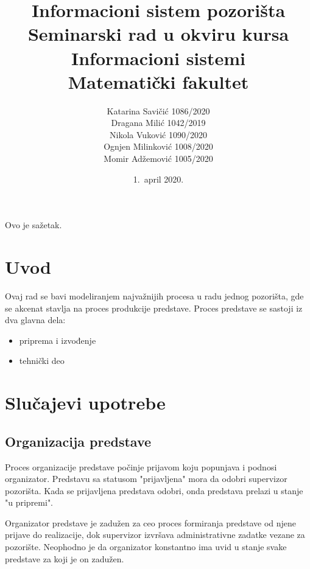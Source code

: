 \documentclass[a4paper]{article}
\begin{document}
\title{Informacioni sistem pozorišta\\ \small{Seminarski rad u okviru kursa\\Informacioni sistemi\\ Matematički fakultet}}

\author{
Katarina Savičić 1086/2020\\
Dragana Milić 1042/2019\\
Nikola Vuković 1090/2020\\
Ognjen Milinković 1008/2020\\
Momir Adžemović 1005/2020
}

\date{1.~april 2020.}

\maketitle

\abstract

Ovo je sažetak.

\newpage

\tableofcontents

\newpage

\section{Uvod}
Ovaj rad se bavi modeliranjem najvažnijih procesa u radu jednog pozorišta, gde se akcenat
stavlja na proces produkcije predstave. Proces predstave se sastoji iz dva glavna 
dela:\cite{hamilton_theatre_producing_the_drama}
\begin{itemize}
  \item priprema i izvođenje
  \item tehnički deo
\end{itemize}

\section{Slučajevi upotrebe}

\subsection{Organizacija predstave}
Proces organizacije predstave počinje prijavom koju popunjava i podnosi organizator. Predstavu sa statusom "prijavljena" mora da odobri supervizor pozorišta. Kada se prijavljena predstava odobri, onda predstava prelazi u stanje "u pripremi". 

Organizator predstave je zadužen za ceo proces formiranja predstave od njene prijave do realizacije, dok supervizor izvršava administrativne zadatke vezane za pozorište. Neophodno je da organizator konstantno ima uvid u stanje svake predstave za koji je on zadužen. 
\end{document}
